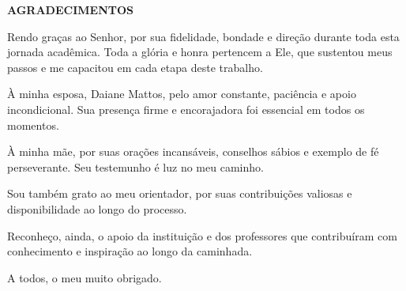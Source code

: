 \newpage
\thispagestyle{empty}

\begin{center}
    \textbf{\MakeUppercase{Agradecimentos}}
\end{center}

\vspace{2cm}

\justifying
Rendo graças ao Senhor, por sua fidelidade, bondade e direção durante toda esta jornada acadêmica. Toda a glória e honra pertencem a Ele, que sustentou meus passos e me capacitou em cada etapa deste trabalho.

À minha esposa, Daiane Mattos, pelo amor constante, paciência e apoio incondicional. Sua presença firme e encorajadora foi essencial em todos os momentos.

À minha mãe, por suas orações incansáveis, conselhos sábios e exemplo de fé perseverante. Seu testemunho é luz no meu caminho.

Sou também grato ao meu orientador, por suas contribuições valiosas e disponibilidade ao longo do processo.

Reconheço, ainda, o apoio da instituição e dos professores que contribuíram com conhecimento e inspiração ao longo da caminhada.

A todos, o meu muito obrigado.
